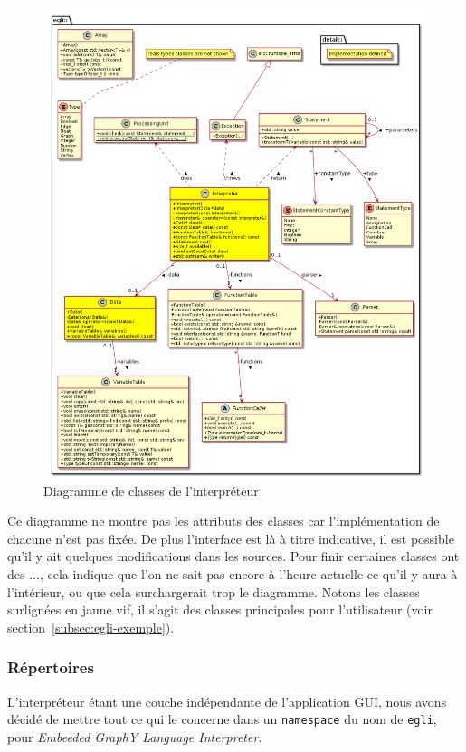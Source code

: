 \documentclass[french]{article}
\begin{document}
				\begin{figure}[H]
					\centering
					\includegraphics[width=\textwidth]{Conception/UMLEGLI}
					\caption{Diagramme de classes de l'interpréteur  \cite{plantuml}}
				\end{figure}
				
				Ce diagramme ne montre pas les attributs des classes car l'implémentation de chacune n'est pas fixée. De plus l'interface est là à titre indicative, il est possible qu'il y ait quelques modifications dans les sources. Pour finir certaines classes ont des $\dots$, cela indique que l'on ne sait pas encore à l'heure actuelle ce qu'il y aura à l'intérieur, ou que cela surchargerait trop le diagramme. Notons les classes surlignées en jaune vif, il s'agit des classes principales pour l'utilisateur (voir section~\ref{subsec:egli-exemple}).  
			
			\subsubsection{Répertoires}
				L'interpréteur étant une couche indépendante de l'application GUI, nous avons décidé de mettre tout ce qui le concerne dans un \texttt{namespace} du nom de \texttt{egli}, pour \textit{Embeeded GraphY Language Interpreter}.\\
				
\end{document}
